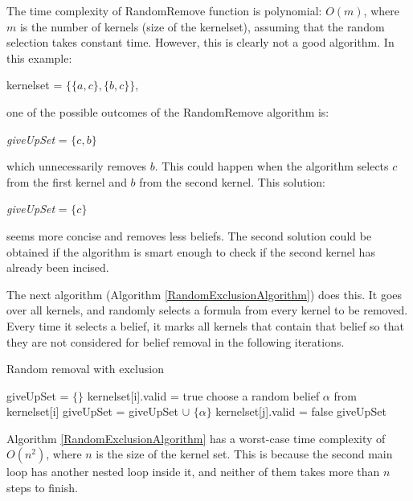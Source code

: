 \documentclass{sfuthesis}
\theoremstyle{plain}
\theoremstyle{definition}
\begin{document}
The time complexity of RandomRemove function is polynomial: $O(m)$, where $m$ is the number of kernels (size of the kernelset), assuming that the random selection takes constant time. However, this is clearly not a good algorithm. In this example:
\begin{center}
kernelset = $\lbrace \lbrace a, c \rbrace, \lbrace b, c \rbrace \rbrace$, 
\end{center}
one of the possible outcomes of the RandomRemove algorithm is:
\begin{center}
\textit{giveUpSet} = $\lbrace c, b \rbrace$
\end{center}
which unnecessarily removes $b$. This could happen when the algorithm selects $c$ from the first kernel and $b$ from the second kernel. This solution:
\begin{center}
\textit{giveUpSet} = $\lbrace c \rbrace$
\end{center}
seems more concise and removes less beliefs. The second solution could be obtained if the algorithm is smart enough to check if the second kernel has already been incised. 

The next algorithm (Algorithm \ref{RandomExclusionAlgorithm}) does this. It goes over all kernels, and randomly selects a formula from every kernel to be removed. Every time it selects a belief, it marks all kernels that contain that belief so that they are not considered for belief removal in the following iterations. 

\begin{algorithm}
\caption{Random removal with exclusion}
\label{RandomExclusionAlgorithm}
\begin{algorithmic}[1]
\State giveUpSet = $\lbrace \rbrace$
\State kernelset[i].valid = true
\EndFor \State
{}
\State choose a random belief $\alpha$ from kernelset[i]
\State giveUpSet = giveUpSet $\cup$ $\lbrace \alpha \rbrace$
\State kernelset[j].valid = false
\EndIf
\EndFor
\EndIf
\EndFor \State
\Return giveUpSet
\EndFunction
\end{algorithmic}
\end{algorithm}

Algorithm \ref{RandomExclusionAlgorithm} has a worst-case time complexity of $O(n^2)$, where $n$ is the size of the kernel set. This is because the second main loop has another nested loop inside it, and neither of them takes more than $n$ steps to finish. 
\end{document}
